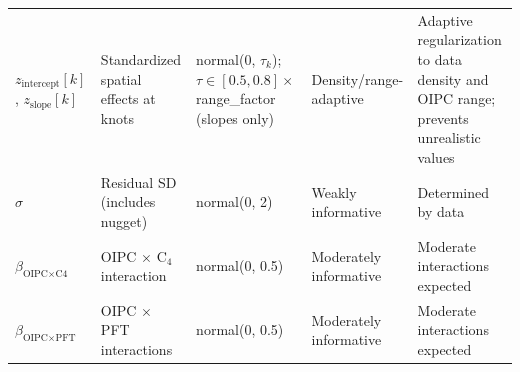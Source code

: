 \documentclass[10pt]{article}
\begin{document}
\begin{longtable}{@{}>{\raggedright\arraybackslash}p{3cm}>{\raggedright\arraybackslash}p{3.2cm}>{\raggedright\arraybackslash}p{4.5cm}>{\raggedright\arraybackslash}p{2.8cm}>{\raggedright\arraybackslash}p{4.8cm}@{}}
$z_{\text{intercept}}[k]$, $z_{\text{slope}}[k]$ & Standardized spatial effects at knots & normal(0, $\tau_k$); $\tau \in [0.5, 0.8] \times$ range\_factor (slopes only) & Density/range-adaptive & Adaptive regularization to data density and OIPC range; prevents unrealistic values \\
$\sigma$ & Residual SD (includes nugget) & normal(0, 2) & Weakly informative & Determined by data \\
$\beta_{\text{OIPC} \times \text{C4}}$ & OIPC $\times$ C$_4$ interaction & normal(0, 0.5) & Moderately informative & Moderate interactions expected \\
$\beta_{\text{OIPC} \times \text{PFT}}$ & OIPC $\times$ PFT interactions & normal(0, 0.5) & Moderately informative & Moderate interactions expected \\
\end{longtable}
\end{document}
